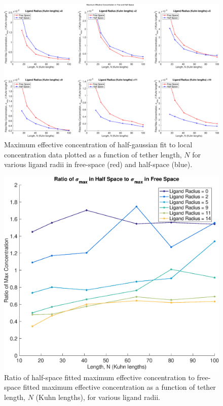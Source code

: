 \documentclass[../../AdvancementSummary.tex]{subfiles}
\begin{document}



\begin{figure}[H]
    \begin{center}
        		\includegraphics[width=\linewidth]{ResultsFigures/MaxEffConc/MaximumEffConcFreeHalf.eps}
        \caption{Maximum effective concentration of half-gaussian fit to local concentration data plotted as a function of tether length, $N$ for various ligand radii in free-space (red) and half-space (blue). \label{fig: MaxEffConc}}
    \end{center}
\end{figure}

\begin{figure}[H]
    \begin{center}
        		\includegraphics[width=0.7\linewidth]{ResultsFigures/MaxEffConc/MaximumEffConcRatio.eps}
        \caption{Ratio of half-space fitted maximum effective concentration to free-space fitted maximum effective concentration as a function of tether length, $N$ (Kuhn lengths), for various ligand radii. \label{fig: MaxEffConcRatio}}
    \end{center}
\end{figure}
\end{document}
